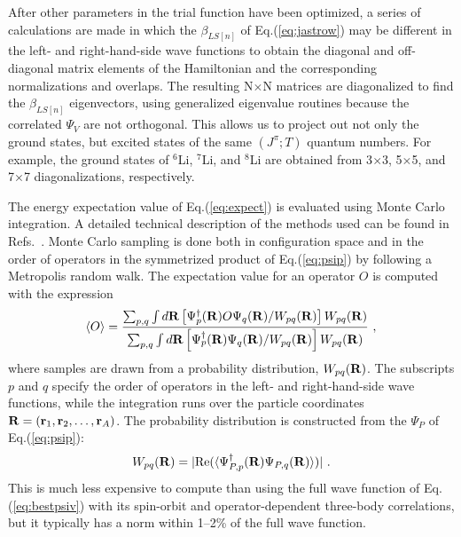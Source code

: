 After other parameters in the trial function have been optimized,  a
series of calculations are made in which the $\beta_{LS[n]}$ of Eq.(\ref{eq:jastrow})
may be different in the left- and right-hand-side wave functions to obtain the
diagonal and off-diagonal matrix elements of the Hamiltonian and the
corresponding normalizations and overlaps.
The resulting N$\times$N matrices are diagonalized to find the $\beta_{LS[n]}$
eigenvectors, using generalized eigenvalue routines because the correlated
$\Psi_V$ are not orthogonal.
This allows us to project out not only the ground states, but excited states
of the same $(J^\pi;T)$ quantum numbers.
For example, the ground states of $^6$Li, $^7$Li, and $^8$Li are obtained
from 3$\times$3, 5$\times$5, and 7$\times$7 diagonalizations, respectively.

The energy expectation value of Eq.(\ref{eq:expect}) is evaluated using Monte
Carlo integration.
A detailed technical description of the methods used can be found in
Refs.~\cite{W91,CW91}.
Monte Carlo sampling is done both in configuration space and in the
order of operators in the symmetrized product of Eq.(\ref{eq:psip})
by following a Metropolis random walk.
The expectation value for an operator $O$ is computed with the expression
\begin{equation}
  \langle O \rangle = \frac
  { \sum_{p,q} \int d{\bf R}
    \left[ \Psi_{p}^{\dagger}({\bf R}) O \Psi_{q}({\bf R}) /
           W_{pq}({\bf R}) \right] W_{pq}({\bf R}) }
  { \sum_{p,q} \int d{\bf R}
    \left[ \Psi_{p}^{\dagger}({\bf R})   \Psi_{q}({\bf R}) /
           W_{pq}({\bf R}) \right] W_{pq}({\bf R}) } \ ,
\end{equation}
where samples are drawn from a probability distribution, $W_{pq}({\bf R})$.
The subscripts $p$ and $q$ specify the order of operators in the left- and
right-hand-side wave functions, while the integration runs over the particle
coordinates ${\bf R}=({\bf r}_1,{\bf r}_2,\ldots,{\bf r}_A)$.
The probability distribution is constructed from the $\Psi_P$ of
Eq.(\ref{eq:psip}):
\begin{equation}
   W_{pq}({\bf R}) = | {\rm Re}( \langle \Psi_{P,p}^{\dagger}({\bf R})
                                       \Psi_{P,q}({\bf R}) \rangle ) | \ .
\label{eq:vmc:weight}
\end{equation}
This is much less expensive to compute than using the
full wave function of Eq.(\ref{eq:bestpsiv}) with its spin-orbit and
operator-dependent three-body correlations, but it typically
has a norm within 1--2\% of the full wave function.

